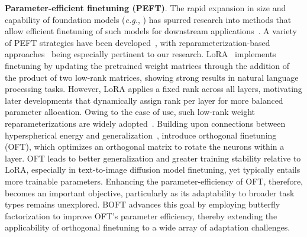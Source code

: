 \textbf{Parameter-efficient finetuning (PEFT)}. The rapid expansion in size and capability of foundation models (\emph{e.g.}, \cite{brown2020language,radford2021learning,rombach2022high,kirillov2023segment}) has spurred research into methods that allow efficient finetuning of such models for downstream applications~\cite{treviso2023efficient,ding2023parameter,lialin2023scaling}. A variety of PEFT strategies have been developed~\cite{houlsby2019parameter,aghajanyan2020intrinsic,hulora2022,edalati2022krona,wang2022adamix,gheini2021cross,zaken2022bitfit,guo2020parameter,sung2021training,ansell2022composable,lester2021power,li2021prefix,vu2022spot,he2021towards,mao2021unipelt,karimi2021compacter,liu2022few,sung2022lst,chen2022parameter,jia2022visual,chen2022adaptformer,zhang2022neural,jie2023fact,lian2022scaling,luo2023towards}, with reparameterization-based approaches~\cite{aghajanyan2020intrinsic,hulora2022,edalati2022krona} being especially pertinent to our research. LoRA~\cite{hulora2022} implements finetuning by updating the pretrained weight matrices through the addition of the product of two low-rank matrices, showing strong results in natural language processing tasks. However, LoRA applies a fixed rank across all layers, motivating later developments \cite{zhang2022adaptive,valipour2022dylora,zhang2023increlora} that dynamically assign rank per layer for more balanced parameter allocation. Owing to the ease of use, such low-rank weight reparameterizations are widely adopted~\cite{dettmers2023qlora,zi2023delta,chavan2023one}. Building upon connections between hyperspherical energy and generalization~\cite{liu2018learning,liu2021orthogonal}, \cite{qiu2023controlling} introduce orthogonal finetuning (OFT), which optimizes an orthogonal matrix to rotate the neurons within a layer. OFT leads to better generalization and greater training stability relative to LoRA, especially in text-to-image diffusion model finetuning, yet typically entails more trainable parameters. Enhancing the parameter-efficiency of OFT, therefore, becomes an important objective, particularly as its adaptability to broader task types remains unexplored. BOFT advances this goal by employing butterfly factorization to improve OFT’s parameter efficiency, thereby extending the applicability of orthogonal finetuning to a wide array of adaptation challenges.

